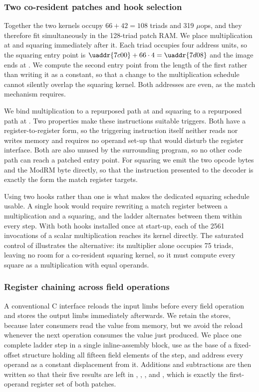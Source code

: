 \subsubsection{Two co-resident patches and hook selection}
\label{sec:c25519-hooks}

Together the two kernels occupy $66+42=108$ triads and 319 $\mu$ops, and they
therefore fit simultaneously in the 128-triad patch RAM.
We place multiplication at  and squaring immediately after it.
Each triad occupies four address units, so the squaring entry point is
$\uaddr{7c00}+66\cdot4=\uaddr{7d08}$ and the image ends at .
We compute the second entry point from the length of the first rather than writing
it as a constant, so that a change to the multiplication schedule cannot silently
overlap the squaring kernel.
Both addresses are even, as the match mechanism requires.

We bind multiplication to a repurposed  path at  and
squaring to a repurposed  path at .
Two properties make these instructions suitable triggers.
Both have a register-to-register form, so the triggering instruction itself
neither reads nor writes memory and requires no operand set-up that would disturb
the register interface.
Both are also unused by the surrounding program, so no other code path can reach a
patched entry point.
For squaring we emit the two opcode bytes and the ModRM byte directly, so that the
instruction presented to the decoder is exactly the form the match register
targets.

Using two hooks rather than one is what makes the dedicated squaring schedule
usable.
A single hook would require rewriting a match register between a multiplication and
a squaring, and the ladder alternates between them within every step.
With both hooks installed once at start-up, each of the 2561 invocations of a
scalar multiplication reaches its kernel directly.
The saturated control of  illustrates the alternative:
its multiplier alone occupies 75 triads, leaving no room for a co-resident squaring
kernel, so it must compute every square as a multiplication with equal operands.

\subsubsection{Register chaining across field operations}
\label{sec:c25519-integration}

A conventional C interface reloads the input limbs before every field operation and
stores the output limbs immediately afterwards.
We retain the stores, because later consumers read the value from memory, but we
avoid the reload whenever the next operation consumes the value just produced.
We place one complete ladder step in a single inline-assembly block, use 
as the base of a fixed-offset structure holding all fifteen field elements of the
step, and address every operand as a constant displacement from it.
Additions and subtractions are then written so that their five results are left in
, , ,  and , which is exactly the
first-operand register set of both patches.

